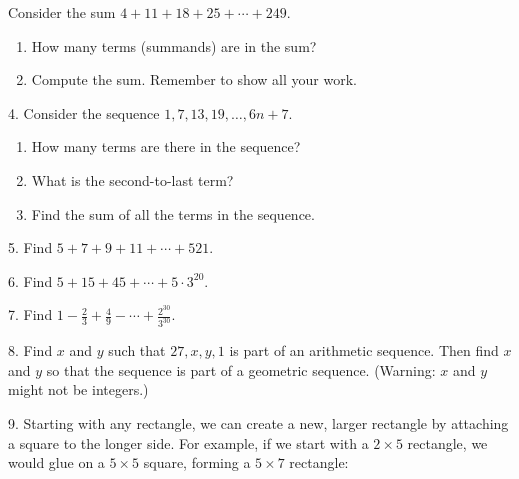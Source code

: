 \documentclass[12pt,]{book}
\theoremstyle{plain}
\theoremstyle{definition}
\theoremstyle{definition}
\theoremstyle{definition}
\numberwithin{equation}{chapter}
\begin{document}
\begin{exerciselist}
Consider the sum \(4 + 11 + 18 + 25 + \cdots + 249\).%
\par
\hypertarget{p-188}{}%
\leavevmode%
\begin{enumerate}[label=(\alph*)]
\item\hypertarget{li-111}{}\hypertarget{p-189}{}%
How many terms (summands) are in the sum?%
\item\hypertarget{li-112}{}\hypertarget{p-190}{}%
Compute the sum. Remember to show all your work.%
\end{enumerate}
%
\par\smallskip
\item[4.]\hypertarget{exercise-13}{}\hypertarget{p-193}{}%
Consider the sequence \(1, 7, 13, 19, \ldots, 6n + 7\).%
\par
\hypertarget{p-194}{}%
\leavevmode%
\begin{enumerate}[label=(\alph*)]
\item\hypertarget{li-115}{}\hypertarget{p-195}{}%
How many terms are there in the sequence?%
\item\hypertarget{li-116}{}\hypertarget{p-196}{}%
What is the second-to-last term?%
\item\hypertarget{li-117}{}\hypertarget{p-197}{}%
Find the sum of all the terms in the sequence.%
\end{enumerate}
%
\par\smallskip
\item[5.]\hypertarget{exercise-14}{}\hypertarget{p-199}{}%
Find \(5 + 7 + 9 + 11+ \cdots + 521\).%
\par\smallskip
\item[6.]\hypertarget{exercise-15}{}\hypertarget{p-201}{}%
Find \(5 + 15 + 45 + \cdots + 5\cdot 3^{20}\).%
\par\smallskip
\item[7.]\hypertarget{exercise-16}{}\hypertarget{p-203}{}%
Find \(1 - \frac{2}{3} + \frac{4}{9} - \cdots + \frac{2^{30}}{3^{30}}\).%
\par\smallskip
\item[8.]\hypertarget{exercise-17}{}\hypertarget{p-204}{}%
Find \(x\) and \(y\) such that \(27, x, y, 1\) is part of an arithmetic sequence. Then find \(x\) and \(y\) so that the sequence is part of a geometric sequence. (Warning: \(x\) and \(y\) might not be integers.)%
\par\smallskip
\item[9.]\hypertarget{exercise-18}{}\hypertarget{p-205}{}%
Starting with any rectangle, we can create a new, larger rectangle by attaching a square to the longer side. For example, if we start with a \(2\times 5\) rectangle, we would glue on a \(5\times 5\) square, forming a \(5 \times 7\) rectangle:%

\end{exerciselist}
\end{document}
